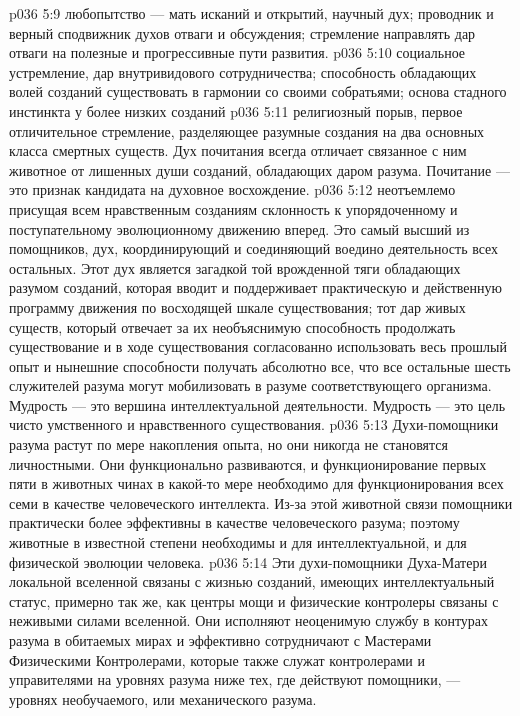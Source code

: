 \vs p036 5:9 \pc {}\bibnobreakspace {} любопытство --- мать исканий и открытий, научный дух; проводник и верный сподвижник духов отваги и обсуждения; стремление направлять дар отваги на полезные и прогрессивные пути развития.
\vs p036 5:10 \pc {}\bibnobreakspace {} социальное устремление, дар внутривидового сотрудничества; способность обладающих волей созданий существовать в гармонии со своими собратьями; основа стадного инстинкта у более низких созданий
\vs p036 5:11 \pc {}\bibnobreakspace {} религиозный порыв, первое отличительное стремление, разделяющее разумные создания на два основных класса смертных существ. Дух почитания всегда отличает связанное с ним животное от лишенных души созданий, обладающих даром разума. Почитание --- это признак кандидата на духовное восхождение.
\vs p036 5:12 \pc {}\bibnobreakspace {} неотъемлемо присущая всем нравственным созданиям склонность к упорядоченному и поступательному эволюционному движению вперед. Это самый высший из помощников, дух, координирующий и соединяющий воедино деятельность всех остальных. Этот дух является загадкой той врожденной тяги обладающих разумом созданий, которая вводит и поддерживает практическую и действенную программу движения по восходящей шкале существования; тот дар живых существ, который отвечает за их необъяснимую способность продолжать существование и в ходе существования согласованно использовать весь прошлый опыт и нынешние способности получать абсолютно все, что все остальные шесть служителей разума могут мобилизовать в разуме соответствующего организма. Мудрость --- это вершина интеллектуальной деятельности. Мудрость --- это цель чисто умственного и нравственного существования.
\vs p036 5:13 \pc Духи\hyp{}помощники разума растут по мере накопления опыта, но они никогда не становятся личностными. Они функционально развиваются, и функционирование первых пяти в животных чинах в какой\hyp{}то мере необходимо для функционирования всех семи в качестве человеческого интеллекта. Из\hyp{}за этой животной связи помощники практически более эффективны в качестве человеческого разума; поэтому животные в известной степени необходимы и для интеллектуальной, и для физической эволюции человека.
\vs p036 5:14 Эти духи\hyp{}помощники Духа\hyp{}Матери локальной вселенной связаны с жизнью созданий, имеющих интеллектуальный статус, примерно так же, как центры мощи и физические контролеры связаны с неживыми силами вселенной. Они исполняют неоценимую службу в контурах разума в обитаемых мирах и эффективно сотрудничают с Мастерами Физическими Контролерами, которые также служат контролерами и управителями на уровнях разума ниже тех, где действуют помощники, --- уровнях необучаемого, или механического разума.

